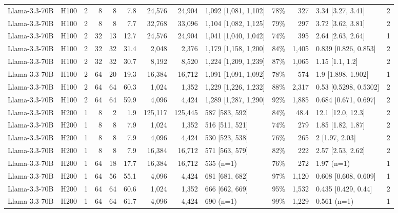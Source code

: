\begin{landscape}
\begin{longtable}{llrrrrrrlrrlr}
Llama-3.3-70B & H100 & 2 & 8 & 8 & 7.8 & 24,576 & 24,904 & 1,092 {[}1,081, 1,102{]} & 78\% & 327 & 3.34 {[}3.27, 3.41{]} & 2 \\
Llama-3.3-70B & H100 & 2 & 8 & 8 & 7.7 & 32,768 & 33,096 & 1,104 {[}1,082, 1,125{]} & 79\% & 297 & 3.72 {[}3.62, 3.81{]} & 2 \\
Llama-3.3-70B & H100 & 2 & 32 & 13 & 12.7 & 24,576 & 24,904 & 1,041 {[}1,040, 1,042{]} & 74\% & 395 & 2.64 {[}2.63, 2.64{]} & 1 \\
Llama-3.3-70B & H100 & 2 & 32 & 32 & 31.4 & 2,048 & 2,376 & 1,179 {[}1,158, 1,200{]} & 84\% & 1,405 & 0.839 {[}0.826, 0.853{]} & 2 \\
Llama-3.3-70B & H100 & 2 & 32 & 32 & 30.7 & 8,192 & 8,520 & 1,224 {[}1,209, 1,239{]} & 87\% & 1,065 & 1.15 {[}1.1, 1.2{]} & 2 \\
Llama-3.3-70B & H100 & 2 & 64 & 20 & 19.3 & 16,384 & 16,712 & 1,091 {[}1,091, 1,092{]} & 78\% & 574 & 1.9 {[}1.898, 1.902{]} & 1 \\
Llama-3.3-70B & H100 & 2 & 64 & 64 & 60.3 & 1,024 & 1,352 & 1,229 {[}1,226, 1,232{]} & 88\% & 2,317 & 0.53 {[}0.5298, 0.5302{]} & 2 \\
Llama-3.3-70B & H100 & 2 & 64 & 64 & 59.9 & 4,096 & 4,424 & 1,289 {[}1,287, 1,290{]} & 92\% & 1,885 & 0.684 {[}0.671, 0.697{]} & 2 \\
Llama-3.3-70B & H200 & 1 & 8 & 2 & 1.9 & 125,117 & 125,445 & 587 {[}583, 592{]} & 84\% & 48.4 & 12.1 {[}12.0, 12.3{]} & 2 \\
Llama-3.3-70B & H200 & 1 & 8 & 8 & 7.9 & 1,024 & 1,352 & 516 {[}511, 521{]} & 74\% & 279 & 1.85 {[}1.82, 1.87{]} & 2 \\
Llama-3.3-70B & H200 & 1 & 8 & 8 & 7.9 & 4,096 & 4,424 & 530 {[}523, 538{]} & 76\% & 265 & 2 {[}1.97, 2.03{]} & 2 \\
Llama-3.3-70B & H200 & 1 & 8 & 8 & 7.9 & 16,384 & 16,712 & 571 {[}563, 579{]} & 82\% & 222 & 2.57 {[}2.53, 2.62{]} & 2 \\
Llama-3.3-70B & H200 & 1 & 64 & 18 & 17.7 & 16,384 & 16,712 & 535 (n=1) & 76\% & 272 & 1.97 (n=1) & 1 \\
Llama-3.3-70B & H200 & 1 & 64 & 56 & 55.1 & 4,096 & 4,424 & 681 {[}681, 682{]} & 97\% & 1,120 & 0.608 {[}0.608, 0.609{]} & 1 \\
Llama-3.3-70B & H200 & 1 & 64 & 64 & 60.6 & 1,024 & 1,352 & 666 {[}662, 669{]} & 95\% & 1,532 & 0.435 {[}0.429, 0.44{]} & 2 \\
Llama-3.3-70B & H200 & 1 & 64 & 64 & 61.7 & 4,096 & 4,424 & 690 (n=1) & 99\% & 1,229 & 0.561 (n=1) & 1 \\

\end{longtable}
\end{landscape}
